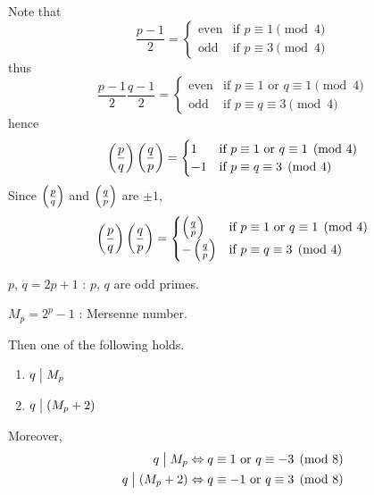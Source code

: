 \begin{remark}
    Note that
    \[
        \frac{p-1}{2} = \begin{cases}
            \mbox{even} & \mbox{if $p\equiv 1 \pmod{4}$} \\
            \mbox{odd} & \mbox{if $p\equiv 3 \pmod{4}$}
        \end{cases}
    \]
    thus
    \[
        \frac{p-1}{2}\frac{q-1}{2} = \begin{cases}
            \mbox{even} & \mbox{if $p\equiv 1$ or $q\equiv 1 \pmod{4}$} \\
            \mbox{odd} & \mbox{if $p\equiv q\equiv 3 \pmod{4}$}
        \end{cases}
    \]
    hence 
    \[
        \left(\frac{p}{q}\right)\left(\frac{q}{p}\right) = \begin{cases}
            1 & \mbox{if $p\equiv 1$ or $q\equiv 1 \pmod{4}$} \\
            -1 & \mbox{if $p\equiv q\equiv 3 \pmod{4}$}
        \end{cases}
    \]
    Since $\left(\frac{p}{q}\right)$ and $\left(\frac{q}{p}\right)$ are $\pm 1$,
    \[
        \left(\frac{p}{q}\right)\left(\frac{q}{p}\right) = \begin{cases}
            \left(\frac{q}{p}\right) & \mbox{if $p\equiv 1$ or $q\equiv 1 \pmod{4}$} \\
            -\left(\frac{q}{p}\right) & \mbox{if $p\equiv q\equiv 3 \pmod{4}$}
        \end{cases}
    \]
\end{remark}

\begin{theorem}
    $p,\,q=2p+1$ : $p$, $q$ are odd primes.

    $M_p=2^p-1$ : Mersenne number.

    Then one of the following holds.
    \begin{enumerate}
        \item $q \bigm| M_p$
        \item $q \bigm| \left( M_p + 2 \right)$
    \end{enumerate}

    Moreover,
    \begin{align*}
        q \bigm| M_p & \Leftrightarrow q \equiv 1 \mbox{ or } q \equiv -3 \pmod{8} \\
        q \bigm| \left(M_p + 2\right) & \Leftrightarrow q \equiv -1 \mbox{ or } q \equiv 3 \pmod{8}
    \end{align*}
\end{theorem}

